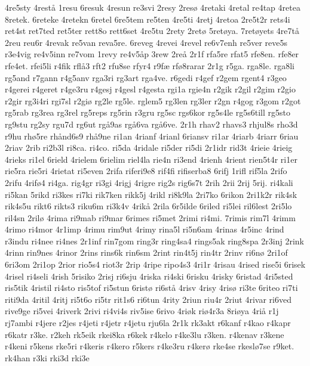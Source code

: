 {4re5sty
4rest^^e5
1resu
6resuk
4resun
re3svi
2resy
2res^^f8
4retaki
4retal
re4tap
4retea
8retek.
6reteke
4retekn
6retel
6re5tem
re5ten
4re5ti
4retj
4retoa
2re5t2r
rets4i
ret4st
ret7ted
ret5ter
rett8o
rett6set
4re5tu
2rety
2ret^^f8
5ret^^f8ya.
7ret^^f8yets
4re7t^^e5
2reu
reu6r
4revak
re5van
reva5re.
6reveg
4revei
4revel
re6v7enh
re5ver
reve5s
r3e4vig
re4v5inn
re7vom
1revy
re4v5^^e5p
3rew
2re^^e5
2r1f
rfa5re
rfat5
rfe8en.
rfe8er
rfe4et.
rfei5li
r4fik
rfl^^e53
rft2
rfu8se
rfyr4
r9f^^e6
rf^^f88rarar
2r1g
r5ga.
rga8le.
rga8li
rg5and
r7gann
r4g5anv
rga3ri
rg3art
rga4ve.
r6gedi
r4gef
r2gem
rgent4
r3geo
r4gerei
r4geret
r4ge3ru
r4gesj
r4gesl
r4gesta
rgi1a
rgie4n
r2gik
r2gil
r2gim
r2gio
r2gir
rg3i4ri
rgi7sl
r2gi^^f8
rg2le
rg5le.
rglem5
rg3len
rg3ler
r2gn
r4gog
r3gom
r2got
rg5rab
rg3rea
rg3rel
rg5reps
rg5rin
r3gru
rg5sc
rgs6kor
rg5s4le
rg5s6till
rg5sto
rg9stu
rg2sy
rgu7d
rg6ut
rg^^e59as
rg^^e56va
rg^^e56ve.
2r1h
rhav2
rhavs3
rhjul8s
rho3d
r9hu
rh^^f85re
rh^^e5nd6s9
rh^^e59ne
ri1an
4rianf
4rianl
6riansv
ri1ar
4riarb
4riarr
6riau
2riav
2rib
ri2b3l
ri8ca.
ri4co.
ri5da
4ridale
ri5der
ri5di
2r1idr
rid3t
4rieie
4rieig
4rieks
ri1el
6rield
4rielem
6rielim
riel4la
rie4n
ri3end
4rienh
4rient
rien5t4r
ri1er
rie5ra
rie5ri
4rietat
ri5even
2rifa
riferi9e8
rif4fi
rifiserba8
6rifj
1rifl
rif5la
2rifo
2rifu
4rif^^f84
ri4ga.
rig4gr
ri3gi
4rigj
4rigre
rig2s
rig6s7t
2rih
2rii
2rij
5rij.
ri4kali
ri5kan
5rikd
ri3kes
ri7ki
rik7ken
rikk5j
4rikl
ri8k9la
2ri7ko
6rikon
2ri1k2r
rik4sk
rik4s5u
rikt6
rikts3
riku6m
ri3k4v
4rik^^e5
2rila
6r5ilde
6riled
ri5lei
ril6lest
2ri5lo
ril4sn
2ril^^f8
4rima
ri9mab
ri9mar
6rimes
ri5met
2rimi
ri4mi.
7rimis
rim7l
4rimm
4rimo
ri4mor
4r1imp
4rimu
rim9ut
4rimy
rina5l
ri5n6am
4rinas
4r5inc
4rind
r3indu
ri4nee
ri4nes
2r1inf
rin7gom
ring3r
ring4sa4
rings5ak
ring8spa
2r3inj
2rink
4rinn
rin9nes
4rinor
2rins
rins6k
rin6sm
2rint
rin4t5j
rin4tr
2rinv
ri6n^^f8
2ri1of
6ri3om
2ri1op
2rior
rio5s4
riot3r
2rip
4ripe
ripo4s3
4ri1r
4risau
4rised
rise5i
6risek
4risel
ri4seli
4rish
5risiko
2risj
ri6sju
4riska
ri4ski
6risku
4risky
6ristad
4ri5sted
ris5tik
4ristil
ri4sto
ris5tof
ri5stun
6rist^^f8
ri6st^^e5
4risv
4risy
4ris^^f8
ri3te
6riteo
ri7ti
riti9da
4ritil
4ritj
ri5t6o
ri5tr
rit1s6
ri6tun
4rity
2riun
riu4r
2riut
4rivar
ri6ved
rive9ge
ri5vei
4riverk
2rivi
ri4vi4s
riv5ise
6rivo
4ri^^f8k
ri^^f84r3a
8ri^^f8ya
4ri^^e5
r1j
rj7ambi
r4jere
r2jes
r4jeti
r4jetr
r4jetu
rju6la
2r1k
rk3akt
r6kanf
r4kao
r4kapr
r6katr
r3ke.
r2keh
rk5eik
rkei8ka
r6kek
r4kelo
r4ke3lu
r3ken.
r4kenav
r3kene
r4keni
r5kens
rke5ri
r4keris
r4kero
r5kers
r4ke3ru
r4ker^^f8
rke4se
rkesl^^f87se
r9ket.
rk4han
r3ki
rki3d
rki3e
}
